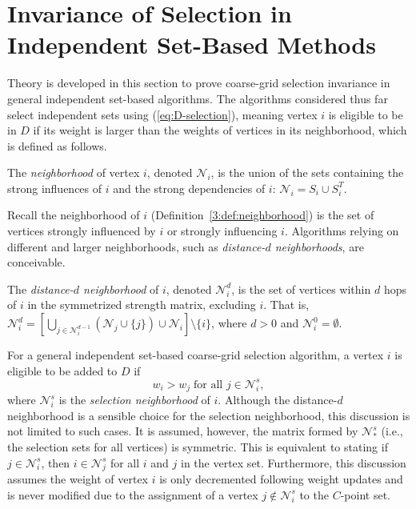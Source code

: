 \documentclass{elsart}
\begin{document}
\section{Invariance of Selection in Independent Set-Based Methods}
\label{sec:invariance}

Theory is developed in this section to prove coarse-grid selection
invariance in general independent set-based algorithms. The algorithms
considered thus far select independent sets using
(\ref{eq:D-selection}), meaning vertex $i$ is eligible to be in $D$ if
its weight is larger than the weights of vertices in its neighborhood,
which is defined as follows.
\begin{defn}
\label{def:neighborhood}
The \emph{neighborhood} of vertex $i$, denoted $\mathcal{N}_i$, is the
union of the sets containing the strong influences of $i$ and the
strong dependencies of $i$: $\mathcal{N}_i = S_i \cup S_i^T$.
\end{defn}
Recall the neighborhood of $i$
(Definition~\ref{3:def:neighborhood}) is the set of vertices strongly
influenced by $i$ or strongly influencing $i$. Algorithms relying on
different and larger neighborhoods, such as \emph{distance-$d$
neighborhoods}, are conceivable.
\begin{defn}
The \emph{distance-$d$ neighborhood} of $i$, denoted
$\mathcal{N}_i^d$, is the set of vertices within $d$ hops of $i$ in
the symmetrized strength matrix, excluding $i$. That is,
$\mathcal{N}_i^d = \left[\bigcup_{j \in
\mathcal{N}_i^{d-1}}\left(\mathcal{N}_j \cup \{j\}\right)\cup
\mathcal{N}_i\right] \setminus \{i\}$, where $d > 0$ and
$\mathcal{N}_i^0 = \emptyset$.
\end{defn}

For a general independent set-based coarse-grid selection algorithm, a
vertex $i$ is eligible to be added to $D$ if
\begin{equation}
\label{5:eqn:general-selection}
w_i > w_j\;\textrm{for all } j \in \mathcal{N}_i^s,
\end{equation}
where $\mathcal{N}_i^s$ is the \emph{selection neighborhood} of
$i$. Although the distance-$d$ neighborhood is a sensible choice for
the selection neighborhood, this discussion is not limited to such
cases. It is assumed, however, the matrix formed by $\mathcal{N}_*^s$
(i.e., the selection sets for all vertices) is symmetric. This is
equivalent to stating if $j \in \mathcal{N}_i^s$, then $i \in
\mathcal{N}_j^s$ for all $i$ and $j$ in the vertex set. Furthermore,
this discussion assumes the weight of vertex $i$ is only decremented
following weight updates and is never modified due to the assignment
of a vertex $j \notin \mathcal{N}_i^s$ to the $C$-point set.
\end{document}
